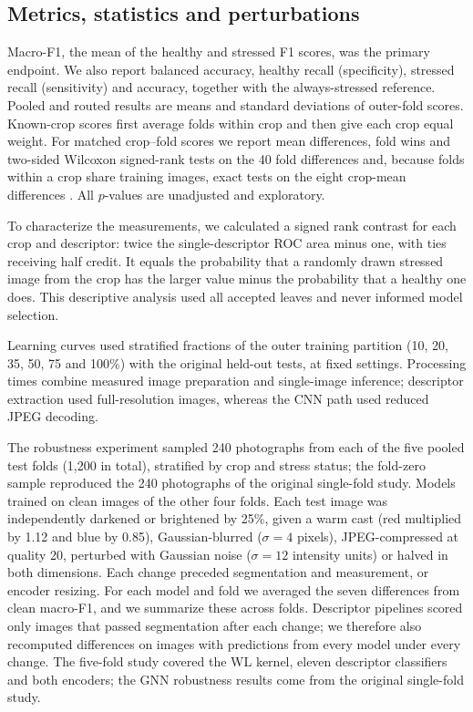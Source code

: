 \subsection{Metrics, statistics and perturbations}
Macro-F1, the mean of the healthy and stressed F1 scores, was the primary endpoint. We also report balanced accuracy, healthy recall (specificity), stressed recall (sensitivity) and accuracy, together with the always-stressed reference. Pooled and routed results are means and standard deviations of outer-fold scores. Known-crop scores first average folds within crop and then give each crop equal weight. For matched crop--fold scores we report mean differences, fold wins and two-sided Wilcoxon signed-rank tests on the 40 fold differences and, because folds within a crop share training images, exact tests on the eight crop-mean differences \citep{Dietterich1998,Nadeau2003}. All $p$-values are unadjusted and exploratory.

To characterize the measurements, we calculated a signed rank contrast for each crop and descriptor: twice the single-descriptor ROC area minus one, with ties receiving half credit. It equals the probability that a randomly drawn stressed image from the crop has the larger value minus the probability that a healthy one does. This descriptive analysis used all accepted leaves and never informed model selection.

Learning curves used stratified fractions of the outer training partition (10, 20, 35, 50, 75 and 100\%) with the original held-out tests, at fixed settings. Processing times combine measured image preparation and single-image inference; descriptor extraction used full-resolution images, whereas the CNN path used reduced JPEG decoding.

The robustness experiment sampled 240 photographs from each of the five pooled test folds (1,200 in total), stratified by crop and stress status; the fold-zero sample reproduced the 240 photographs of the original single-fold study. Models trained on clean images of the other four folds. Each test image was independently darkened or brightened by 25\%, given a warm cast (red multiplied by 1.12 and blue by 0.85), Gaussian-blurred ($\sigma=4$ pixels), JPEG-compressed at quality 20, perturbed with Gaussian noise ($\sigma=12$ intensity units) or halved in both dimensions. Each change preceded segmentation and measurement, or encoder resizing. For each model and fold we averaged the seven differences from clean macro-F1, and we summarize these across folds. Descriptor pipelines scored only images that passed segmentation after each change; we therefore also recomputed differences on images with predictions from every model under every change. The five-fold study covered the WL kernel, eleven descriptor classifiers and both encoders; the GNN robustness results come from the original single-fold study.

